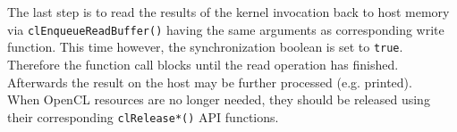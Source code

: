 The last step is to read the results of the kernel invocation back to host memory via \lstinline!clEnqueueReadBuffer()! having the same arguments as corresponding write function. This time however, the synchronization boolean is set to \lstinline!true!. Therefore the function call blocks until the read operation has finished. Afterwards the result on the host may be further processed (e.g. printed). \\
When OpenCL resources are no longer needed, they should be released using their corresponding \lstinline!clRelease*()! API functions.